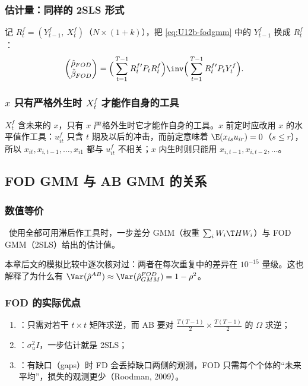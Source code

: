 \subsubsection{估计量：同样的 2SLS 形式}

记 $R_t^f=(Y_{t-1}^f,\ X_t^f)$（$N\times(1+k)$），把 \eqref{eq:U12b-fodgmm} 中的 $Y_{t-1}^f$ 换成 $R_t^f$：
\[
\begin{pmatrix}\hat\rho_{FOD}\\ \hat\beta_{FOD}\end{pmatrix}
=\Big(\sum_{t=1}^{T-1}R_t^{f\prime}P_tR_t^f\Big)\inv\Big(\sum_{t=1}^{T-1}R_t^{f\prime}P_tY_t^f\Big).
\]

\subsubsection{\texorpdfstring{$x$}{x} 只有严格外生时 \texorpdfstring{$X_t^f$}{X\_t f} 才能作自身的工具}

$X_t^f$ 含未来的 $x$，只有 $x$ 严格外生时它才能作自身的工具。$x$ 前定时应改用 $x$ 的水平值作工具：$u_{it}^f$ 只含 $t$ 期及以后的冲击，而前定意味着 $\E(x_{is}u_{ir})=0$（$s\le r$），所以 $x_{it},x_{i,t-1},\dots,x_{i1}$ 都与 $u_{it}^f$ 不相关；$x$ 内生时则只能用 $x_{i,t-1},x_{i,t-2},\dots$。

\subsection{FOD GMM 与 AB GMM 的关系}

\subsubsection{数值等价}

\begin{thm}\label{thm:U12b-equiv}
\tagext\ 使用全部可用滞后作工具时，一步差分 GMM（权重 $\sum_iW_i\T HW_i$）与 FOD GMM（2SLS）给出的估计值。
\end{thm}
本章后文的模拟比较中逐次核对过：两者在每次重复中的差异在 $10^{-15}$ 量级。这也解释了为什么有 $\Var(\hat\rho^{AB})\approx\Var(\hat\rho^{FOD}_{GMM})=1-\rho^2$。

\subsubsection{FOD 的实际优点}

\begin{enumerate}
  \item {}：只需对若干 $t\times t$ 矩阵求逆，而 AB 要对 $\frac{T(T-1)}{2}\times\frac{T(T-1)}{2}$ 的 $\Omega$ 求逆；
  \item {}：$\sigma_u^2I$，一步估计就是 2SLS；
  \item {}：有缺口（gaps）时 FD 会丢掉缺口两侧的观测，FOD 只需每个个体的“未来平均”，损失的观测更少（Roodman, 2009）。
\end{enumerate}

